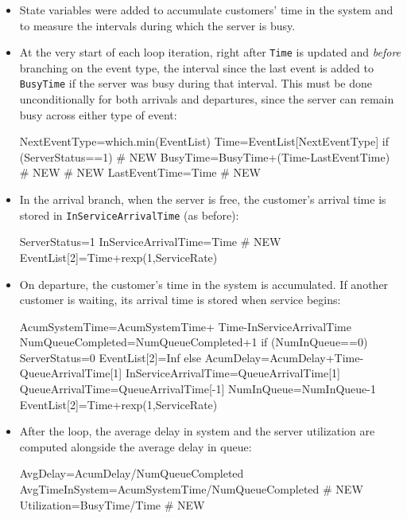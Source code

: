 \documentclass[12pt]{article}
\begin{document}
\begin{itemize}
    \item State variables were added to accumulate customers' time in the system and to measure the intervals during which the server is busy.
    \item At the very start of each loop iteration, right after \texttt{Time} is updated and \emph{before} branching on the event type, the interval since the last event is added to \texttt{BusyTime} if the server was busy during that interval. This must be done unconditionally for both arrivals and departures, since the server can remain busy across either type of event:
    \begin{configbox}
NextEventType=which.min(EventList)
Time=EventList[NextEventType]
if (ServerStatus==1) {                    # NEW
  BusyTime=BusyTime+(Time-LastEventTime)  # NEW
}                                          # NEW
LastEventTime=Time                        # NEW
    \end{configbox}
    \item In the arrival branch, when the server is free, the customer's arrival time is stored in \texttt{InServiceArrivalTime} (as before):
    \begin{configbox}
ServerStatus=1
InServiceArrivalTime=Time          # NEW
EventList[2]=Time+rexp(1,ServiceRate)
    \end{configbox}
        \item On departure, the customer's time in the system is accumulated. If another customer is waiting, its arrival time is stored when service begins:
    \begin{configbox}
AcumSystemTime=AcumSystemTime+
    Time-InServiceArrivalTime
NumQueueCompleted=NumQueueCompleted+1
if (NumInQueue==0) {
  ServerStatus=0
  EventList[2]=Inf
} else {
  AcumDelay=AcumDelay+Time-QueueArrivalTime[1]
    InServiceArrivalTime=QueueArrivalTime[1]
  QueueArrivalTime=QueueArrivalTime[-1]
  NumInQueue=NumInQueue-1
  EventList[2]=Time+rexp(1,ServiceRate)
}
    \end{configbox}
    \item After the loop, the average delay in system and the server utilization are computed alongside the average delay in queue:
    \begin{configbox}
AvgDelay=AcumDelay/NumQueueCompleted
AvgTimeInSystem=AcumSystemTime/NumQueueCompleted   # NEW
Utilization=BusyTime/Time                          # NEW
    \end{configbox}
\end{itemize}
\end{document}

